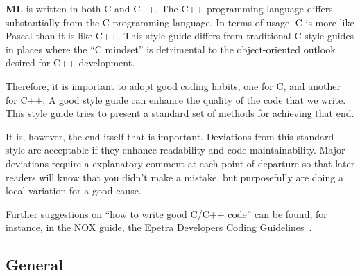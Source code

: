 \documentclass[10pt,letter,relax]{SANDreport}
\newcommand{\ML}     {{\bf ML }}
\begin{document}
\ML is written in both C and C++.
The C++ programming language differs substantially from the C
programming language. In terms of usage, C is more like Pascal than it
is like C++. This style guide differs from traditional C style guides in
places where the ``C mindset'' is detrimental to the object-oriented
outlook desired for C++ development.

Therefore, it is important to adopt good coding habits, one for C, and
another for C++. A good style guide can enhance the quality of the code
that we write.  This style guide tries to present a standard set of
methods for achieving that end.

It is, however, the end itself that is important. Deviations from this
standard style are acceptable if they enhance readability and code
maintainability. Major deviations require a explanatory comment at each
point of departure so that later readers will know that you didn't make
a mistake, but purposefully are doing a local variation for a good
cause.

Further suggestions on ``how to write good C/C++ code'' can be found,
for instance, in the NOX guide, the Epetra Developers Coding
Guidelines~\cite{Epetra-Dev-Guide}.

\subsection{General}
\end{document}
